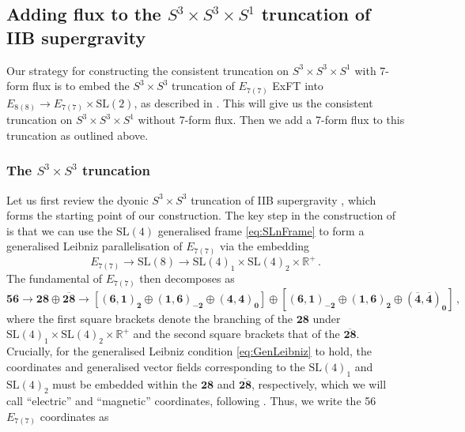 \documentclass[a4paper, 11pt]{article}
\numberwithin{equation}{section}
\newcommand{\SL}[1]{\mathrm{SL}( #1 )}
\newcommand{\EE}{\ensuremath{E_{8(8)}}\xspace}
\newcommand{\En}[1]{E_{#1(#1)}}
\newcommand{\+}{\oplus}
\begin{document}
\subsection{Adding flux to the $S^3 \times S^3 \times S^1$ truncation of IIB supergravity}
Our strategy for constructing the consistent truncation on $S^3 \times S^3 \times S^1$ with 7-form flux is to embed the $S^3 \times S^3$ truncation of $\En{7}$ ExFT \cite{Inverso:2016eet} into $\EE \rightarrow \En{7} \times \SL{2}$, as described in \cite{Galli:2022idq}. This will give us the consistent truncation on $S^3 \times S^3 \times S^1$ without 7-form flux. Then we add a 7-form flux to this truncation as outlined above.

\subsubsection{The $S^3 \times S^3$ truncation} \label{s:S3S3}
Let us first review the dyonic $S^3 \times S^3$ truncation of IIB supergravity \cite{Inverso:2016eet}, which forms the starting point of our construction. The key step in the construction of \cite{Inverso:2016eet} is that we can use the $\SL{4}$ generalised frame \eqref{eq:SLnFrame} to form a generalised Leibniz parallelisation of $\En{7}$ via the embedding
\begin{equation} \label{eq:SL4Embedding}
	\En{7} \rightarrow \SL{8} \rightarrow \SL{4}_1 \times \SL{4}_2 \times \mathbb{R}^+ \,.
\end{equation}
The fundamental of $\En{7}$ then decomposes as
\begin{equation} \label{eq:56inSL4SL4}
	\mathbf{56} \rightarrow \mathbf{28} \oplus \overline{\mathbf{28}} \rightarrow \left[ \mathbf{\left(6,1\right)_2} \oplus \mathbf{\left(1,6\right)_{-2}} \oplus \mathbf{\left(4,4\right)_0} \right] \oplus \left[ \mathbf{\left(6,1\right)_{-2}} \oplus \mathbf{\left(1,6\right)_{2}} \oplus \mathbf{\left(\overline{4},\overline{4}\right)_0} \right] \,,
\end{equation}
where the first square brackets denote the branching of the $\mathbf{28}$ under $\SL{4}_1 \times \SL{4}_2 \times \mathbb{R}^+$ and the second square brackets that of the $\mathbf{\overline{28}}$. Crucially, for the generalised Leibniz condition \eqref{eq:GenLeibniz} to hold, the coordinates and generalised vector fields corresponding to the $\SL{4}_1$ and $\SL{4}_2$ must be embedded within the $\mathbf{28}$ and $\mathbf{\overline{28}}$, respectively, which we will call ``electric'' and ``magnetic'' coordinates, following \cite{Inverso:2016eet}. Thus, we write the 56 $\En{7}$ coordinates as
\end{document}
